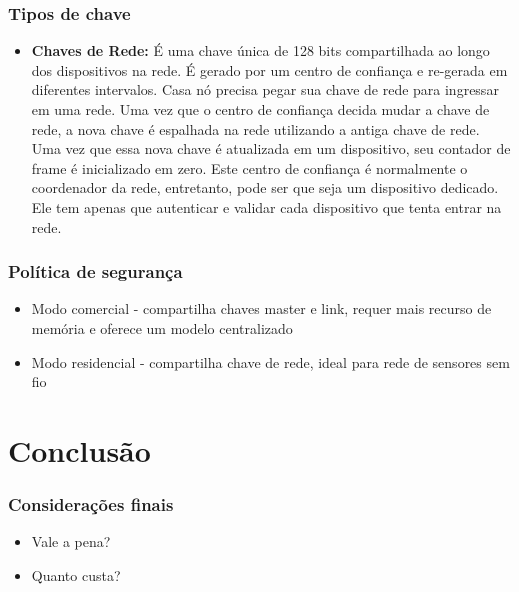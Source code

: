 \documentclass{beamer}
\begin{document}
  \frame
  {
    \frametitle{Tipos de chave}
      \begin{itemize}
       \item \textbf{Chaves de Rede:} É uma chave única de 128 bits compartilhada ao longo dos dispositivos
na rede. É gerado por um centro de confiança e re-gerada em diferentes
intervalos. Casa nó precisa pegar sua chave de rede para ingressar em uma rede.
Uma vez que o centro de confiança decida mudar a chave de rede, a nova chave é
espalhada na rede utilizando a antiga chave de rede. Uma vez que essa nova chave
é atualizada em um dispositivo, seu contador de frame é inicializado em zero. Este
centro de confiança é normalmente o coordenador da rede, entretanto, pode ser que
seja um dispositivo dedicado. Ele tem apenas que autenticar e validar cada dispositivo
que tenta entrar na rede.
      \end{itemize}
  }

    \frame
  {
    \frametitle{Política de segurança}
      \begin{itemize}
       \item Modo comercial - compartilha chaves master e link, requer mais recurso de memória e oferece um modelo centralizado
       \item Modo residencial - compartilha chave de rede, ideal para rede de sensores sem fio
      \end{itemize}
  }

  \section{Conclusão}
  \frame
  {
    \frametitle{Considerações finais}
      \begin{itemize}
       \item Vale a pena?
       \item Quanto custa?
      \end{itemize}
  }
  
\end{document}
